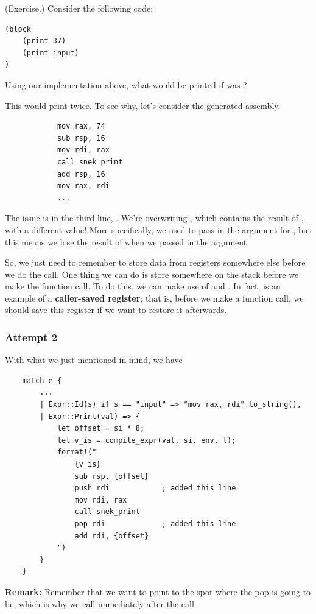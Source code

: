 \begin{mdframed}
    (Exercise.) Consider the following code: 
    \begin{verbatim}
(block 
    (print 37)
    (print input)
)\end{verbatim}
    Using our implementation above, what would be printed if  was ? 

    \begin{mdframed}
        This would print  twice. To see why, let's consider the generated assembly.
        \begin{verbatim}
            mov rax, 74
            sub rsp, 16 
            mov rdi, rax 
            call snek_print 
            add rsp, 16 
            mov rax, rdi 
            ... \end{verbatim}
        The issue is in the third line, . We're overwriting , which contains the result of , with a different value! More specifically, we used  to pass in the argument for , but this means we lose the result of  when we passed in the argument.
    \end{mdframed}
\end{mdframed}
So, we just need to remember to store data from registers somewhere else before we do the call. One thing we can do is store  somewhere on the stack before we make the function call. To do this, we can make use of  and . In fact,  is an example of a \textbf{caller-saved register}; that is, before we make a function call, we should save this register if we want to restore it afterwards. 


\subsubsection{Attempt 2}
With what we just mentioned in mind, we have 
\begin{verbatim}
    match e {
        ... 
        | Expr::Id(s) if s == "input" => "mov rax, rdi".to_string(),
        | Expr::Print(val) => {
            let offset = si * 8; 
            let v_is = compile_expr(val, si, env, l);
            format!("
                {v_is}
                sub rsp, {offset}
                push rdi            ; added this line 
                mov rdi, rax 
                call snek_print
                pop rdi             ; added this line 
                add rdi, {offset}
            ")
        }
    }\end{verbatim}
\textbf{Remark:} Remember that we want  to point to the spot where the pop is going to be, which is why we call  immediately after the  call. 

